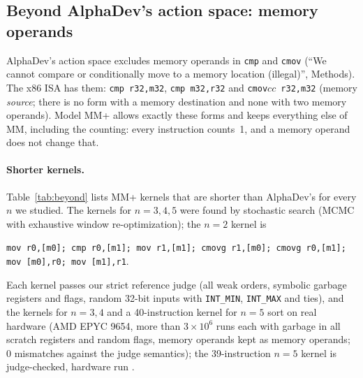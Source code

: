 \subsection{Beyond AlphaDev's action space: memory operands}\label{sec:beyond}

AlphaDev's action space excludes memory operands in \texttt{cmp} and \texttt{cmov} (``We cannot compare or conditionally move
to a memory location (illegal)'', Methods). The x86 ISA has them: \texttt{cmp r32,m32}, \texttt{cmp m32,r32} and
\texttt{cmov}$cc$\texttt{ r32,m32} (memory \emph{source}; there is no form with a memory destination and none with two memory
operands). Model MM+ allows exactly these forms and keeps everything else of MM, including the counting: every instruction
counts~1, and a memory operand does not change that.

\paragraph{Shorter kernels.} Table~\ref{tab:beyond} lists MM+ kernels that are shorter than AlphaDev's for every $n$ we
studied. The kernels for $n = 3, 4, 5$ were found by stochastic search (MCMC with exhaustive window re-optimization); the
$n = 2$ kernel is
\begin{center}\small
\texttt{mov r0,[m0]; cmp r0,[m1]; mov r1,[m1]; cmovg r1,[m0]; cmovg r0,[m1]; mov [m0],r0; mov [m1],r1}.
\end{center}
Each kernel passes our strict reference judge (all weak orders, symbolic garbage registers and flags, random 32-bit inputs
with \texttt{INT\_MIN}, \texttt{INT\_MAX} and ties), and the kernels for $n = 3, 4$ and a 40-instruction kernel for
$n = 5$ sort on real hardware (AMD EPYC 9654, more than $3 \times 10^6$ runs each with garbage in all scratch registers and random flags, memory operands kept as memory
operands; 0 mismatches against the judge semantics); the 39-instruction $n = 5$ kernel is judge-checked, hardware run
\pending.


